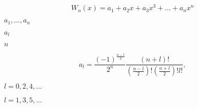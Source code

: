 \documentclass{article}
\begin{document}
\[ W_n(x) = a_1 + a_2 x + a_3 x^3 + \dots + a_n x^n \]
\pagebreak

$ a_1,\dots,a_n $
\pagebreak

$ a_l $
\pagebreak

$ n $
\pagebreak

\[ a_l = \frac{(-1)^{\frac{n-l}{2}}}{2^n} \frac{ (n+l)! } { (\frac{n-l}{2})! (\frac{n+l}{2})! l! } , \]
\pagebreak

$ l=0,2,4,\dots $
\pagebreak

$ l=1,3,5,\dots $
\pagebreak
\end{document}

